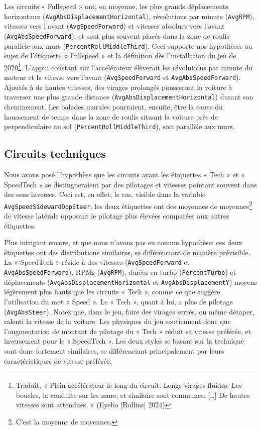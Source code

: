 \documentclass[
  oneside,
  open=any]{scrreprt}
\begin{document}
Les circuits « Fullspeed » ont, en moyenne, les plus grands déplacements
horizontaux (\texttt{AvgAbsDisplacementHorizontal}), révolutions par
minute (\texttt{AvgRPM}), vitesses vers l'avant
(\texttt{AvgSpeedForward}) et vitesses absolues vers l'avant
(\texttt{AvgAbsSpeedForward}), et sont plus souvent placés dans la zone
de roulis parallèle aux murs (\texttt{PercentRollMiddleThird}). Ceci
supporte nos hypothèses au sujet de l'étiquette « Fullspeed » et la
définition dès l'installation du jeu de 2020\footnote{Traduit, « Plein
  accélérateur le long du circuit. Longs virages fluides. Les boucles,
  la conduite sur les murs, et similaire sont communes. {[}\ldots{]} De
  hautes vitesses sont attendues. » (Eyebo {[}Rollins{]} 2024)}. L'appui
constant sur l'accélérateur élèverait les révolutions par minute du
moteur et la vitesse vers l'avant (\texttt{AvgSpeedForward} et
\texttt{AvgAbsSpeedForward}). Ajoutés à de hautes vitesses, des virages
prolongés pousseront la voiture à traverser une plus grande distance
(\texttt{AvgAbsDisplacementHorizontal}) durant son cheminement. Les
balades murales pourraient, ensuite, être la cause du haussement de
temps dans la zone de roulis situant la voiture près de perpendiculaire
au sol (\texttt{PercentRollMiddleThird}), soit parallèle aux murs.

\subsection{Circuits techniques}\label{circuits-techniques}

Nous avons posé l'hypothèse que les circuits ayant les étiquettes « Tech
» et « SpeedTech » se distingueraient par des pilotages et vitesses
pointant souvent dans des sens inverses. Ceci est, en effet, le cas,
visible dans la variable \texttt{AvgSpeedSidewardOppSteer}; les deux
étiquettes ont des moyennes de moyennes\footnote{C'est la moyenne de
  moyennes.} de vitesse latérale opposant le pilotage plus élevées
comparées aux autres étiquettes.

Plus intrigant encore, et que nous n'avons pas eu comme hypothèse: ces
deux étiquettes ont des distributions similaires, se différenciant de
manière prévisible. La « SpeedTech » réside à des vitesses
(\texttt{AvgSpeedForward} et \texttt{AvgAbsSpeedForward}), RPMs
(\texttt{AvgRPM}), durées en turbo (\texttt{PercentTurbo}) et
déplacements (\texttt{AvgAbsDisplacementHorizontal} et
\texttt{AvgAbsDisplacementY}) moyens légèrement plus hauts que les
circuits « Tech », comme ce que suggère l'utilisation du mot « Speed ».
Le « Tech », quant à lui, a plus de pilotage (\texttt{AvgAbsSteer}).
Notez que, dans le jeu, faire des virages serrés, ou même déraper,
ralenti la vitesse de la voiture. Les physiques du jeu soutiennent donc
que l'augmentation de montant de pilotage du « Tech » réduit sa vitesse
préférée, et inversement pour le « SpeedTech ». Les deux styles se
basant sur la technique sont donc fortement similaires, se différenciant
principalement par leurs caractéristiques de vitesse préférée.
\end{document}
